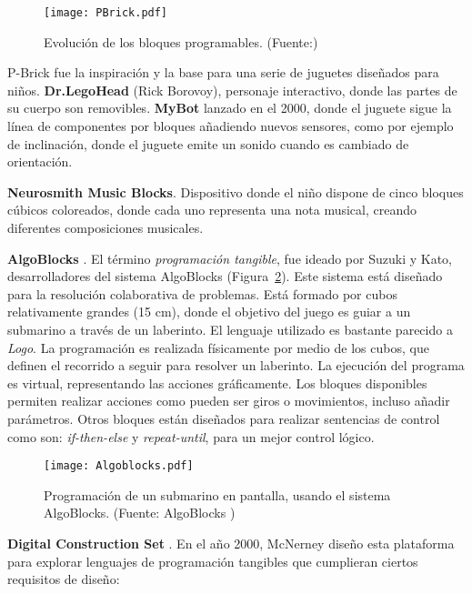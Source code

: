 \begin{figure}[!h]
\begin{center}
\texttt{[image: PBrick.pdf]}
\caption{Evolución de los bloques programables. (Fuente:\cite{McNerney})}
\label{fig:PBrick}
\end{center}
\end{figure}

P-Brick fue la inspiración y la base para una serie de juguetes diseñados para niños. \textbf{Dr.LegoHead} (Rick Borovoy), personaje interactivo, donde las partes de su cuerpo son removibles. \textbf{MyBot} lanzado en el 2000, donde el juguete sigue la línea de componentes por bloques añadiendo nuevos sensores, como por ejemplo de inclinación, donde el juguete emite un sonido cuando es cambiado de orientación.

\textbf{Neurosmith Music Blocks}. Dispositivo donde el niño dispone de cinco bloques cúbicos coloreados, donde cada uno representa una nota musical, creando diferentes composiciones musicales.

\textbf{AlgoBlocks} \cite{Suzuki}. El término \emph{programación tangible}, fue ideado por Suzuki y Kato, desarrolladores del sistema AlgoBlocks (Figura~\ref{fig:Algoblocks}). Este sistema está diseñado para la resolución colaborativa de problemas. Está formado por cubos relativamente grandes (15 cm), donde el objetivo del juego es guiar a un submarino a través de un laberinto. El lenguaje utilizado es bastante parecido a \emph{Logo}. La programación es realizada físicamente por medio de los cubos, que definen el recorrido a seguir para resolver un laberinto. La ejecución del programa es virtual, representando las acciones gráficamente. Los bloques disponibles permiten realizar acciones como pueden ser giros o movimientos, incluso añadir parámetros. Otros bloques están diseñados para realizar sentencias de control como son: \emph{if-then-else} y \emph{repeat-until}, para un mejor control lógico. 


\begin{figure}[!h]
\begin{center}
\texttt{[image: Algoblocks.pdf]}
\caption{Programación de un submarino en pantalla, usando el sistema AlgoBlocks. (Fuente: AlgoBlocks \cite{Suzuki})}
\label{fig:Algoblocks}
\end{center}
\end{figure}

\textbf{Digital Construction Set} \cite{McNerneyBricks}. En el año 2000, McNerney diseño esta plataforma para explorar lenguajes de programación tangibles que cumplieran ciertos requisitos de diseño: 

